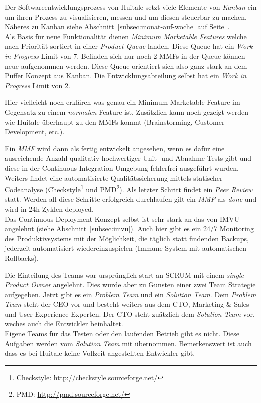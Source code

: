  Der Softwareentwicklungsprozess von Huitale setzt viele
Elemente von \emph{Kanban} ein um ihren Prozess zu visualisieren, messen und
um diesen steuerbar zu machen. Näheres zu Kanban siehe Abschnitt~\ref{subsec:monat-auf-woche}
auf Seite~\pageref{subsec:monat-auf-woche}. \\
Als Basis für neue Funktionalität dienen \emph{Minimum Marketable Features}
welche nach Priorität sortiert in einer \emph{Product Queue} landen. Diese
Queue hat ein \emph{Work in Progress} Limit von 7. Befinden sich nur noch 2
MMFs in der Queue können neue aufgenommen werden. Diese Queue orientiert sich
also ganz stark an dem Puffer Konzept aus Kanban. Die Entwicklungsabteilung
selbst hat ein \emph{Work in Progress} Limit von 2.

\begin{wichtigbox}
Hier vielleicht noch erklären was genau ein Minimum Marketable Feature im
Gegensatz zu einem \emph{normalen} Feature ist. Zusätzlich kann noch gezeigt
werden wie Huitale überhaupt zu den MMFs kommt (Brainstorming, Customer
Development, etc.).
\end{wichtigbox}

Ein \emph{MMF} wird dann als fertig entwickelt angesehen, wenn es dafür eine
ausreichende Anzahl qualitativ hochwertiger Unit- und Abnahme-Tests gibt und
diese in der Continuous Integration Umgebung fehlerfrei ausgeführt wurden.
Weiters findet eine automatisierte Qualitätssicherung mittels statischer
Codeanalyse (Checkstyle\footnote{Checkstyle:
\url{http://checkstyle.sourceforge.net/}} und PMD\footnote{PMD:
\url{http://pmd.sourceforge.net/}}). Als letzter Schritt findet ein \emph{Peer
Review} statt. Werden all diese Schritte erfolgreich durchlaufen gilt ein
\emph{MMF} als \emph{done} und wird in 24h Zyklen deployed.\\
Das Continuous Deployment Konzept selbst ist sehr stark an das von IMVU
angelehnt (siehe Abschnitt~\ref{subsec:imvu}). Auch hier gibt es ein 24/7
Monitoring des Produktivsystems mit der Möglichkeit, die täglich statt
findenden Backups, jederzeit automatisiert wiedereinzuspielen (Immune System
mit automatischen Rollbacks).

Die Einteilung des Teams war ursprünglich start an SCRUM mit einem
\emph{single Product Owner} angelehnt. Dies wurde aber zu Gunsten einer zwei
Team Strategie aufgegeben. Jetzt gibt es ein \emph{Problem Team} und ein
\emph{Solution Team}. Dem \emph{Problem Team} steht der CEO vor und besteht
weiters aus dem CTO, Marketing \& Sales und User Experience Experten. Der CTO
steht zuätzlich dem \emph{Solution Team} vor, weches auch die Entwickler
beinhaltet.\\
Eigene Teams für das Testen oder den laufenden Betrieb gibt es nicht. Diese
Aufgaben werden vom \emph{Solution Team} mit übernommen. Bemerkenswert ist auch
dass es bei Huitale keine Vollzeit angestellten Entwickler gibt.

